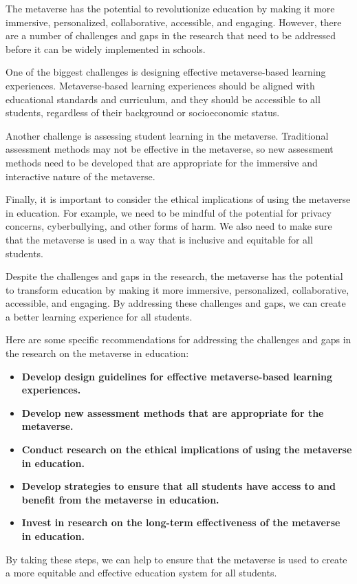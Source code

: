 \documentclass[12pt]{extarticle}
\begin{document}
The metaverse has the potential to revolutionize education by making it more immersive, personalized, collaborative, accessible, and engaging. However, there are a number of challenges and gaps in the research that need to be addressed before it can be widely implemented in schools.

One of the biggest challenges is designing effective metaverse-based learning experiences. Metaverse-based learning experiences should be aligned with educational standards and curriculum, and they should be accessible to all students, regardless of their background or socioeconomic status.

Another challenge is assessing student learning in the metaverse. Traditional assessment methods may not be effective in the metaverse, so new assessment methods need to be developed that are appropriate for the immersive and interactive nature of the metaverse.

Finally, it is important to consider the ethical implications of using the metaverse in education. For example, we need to be mindful of the potential for privacy concerns, cyberbullying, and other forms of harm. We also need to make sure that the metaverse is used in a way that is inclusive and equitable for all students.

Despite the challenges and gaps in the research, the metaverse has the potential to transform education by making it more immersive, personalized, collaborative, accessible, and engaging. By addressing these challenges and gaps, we can create a better learning experience for all students.

Here are some specific recommendations for addressing the challenges and gaps in the research on the metaverse in education:

\begin{itemize}
    \item \textbf{Develop design guidelines for effective metaverse-based learning experiences.}
    \item \textbf{Develop new assessment methods that are appropriate for the metaverse.}
    \item \textbf{Conduct research on the ethical implications of using the metaverse in education.}
    \item \textbf{Develop strategies to ensure that all students have access to and benefit from the metaverse in education.}
    \item \textbf{Invest in research on the long-term effectiveness of the metaverse in education.}
\end{itemize}

By taking these steps, we can help to ensure that the metaverse is used to create a more equitable and effective education system for all students.

\citep{jeongmeta}
\citep{jeoncase}
\citep{kanematsu}
\citep{farjami}
\citep{gwojen}

\end{document}
